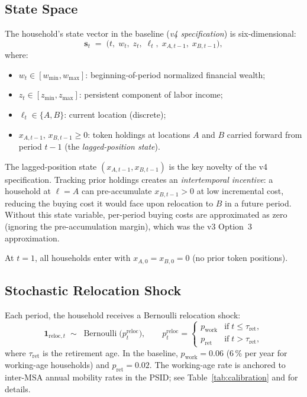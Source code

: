 \subsection{State Space}
\label{sec:model:state}

The household's state vector in the baseline (\emph{v4 specification}) is
six-dimensional:
\begin{equation}
    \mathbf{s}_t \;=\;
    \bigl(t,\;w_t,\;z_t,\;\ell_t,\;x_{A,t-1},\;x_{B,t-1}\bigr),
    \label{eq:state}
\end{equation}
where:
\begin{itemize}[noitemsep]
    \item $w_t \in [w_{\min}, w_{\max}]$: beginning-of-period normalized
          financial wealth;
    \item $z_t \in [z_{\min}, z_{\max}]$: persistent component of labor income;
    \item $\ell_t \in \{A, B\}$: current location (discrete);
    \item $x_{A,t-1},\, x_{B,t-1} \geq 0$: token holdings at locations $A$ and
          $B$ carried forward from period $t-1$ (the \emph{lagged-position state}).
\end{itemize}
The lagged-position state $(x_{A,t-1}, x_{B,t-1})$ is the key novelty of the
v4 specification.  Tracking prior holdings creates an \emph{intertemporal
incentive}: a household at $\ell = A$ can pre-accumulate $x_{B,t-1} > 0$
at low incremental cost, reducing the buying cost it would face upon
relocation to $B$ in a future period.
Without this state variable, per-period buying costs are approximated as
zero (ignoring the pre-accumulation margin), which was the v3 Option~3
approximation.

At $t = 1$, all households enter with $x_{A,0} = x_{B,0} = 0$ (no prior
token positions).

\subsection{Stochastic Relocation Shock}
\label{sec:model:relocation}

Each period, the household receives a Bernoulli relocation shock:
\begin{equation}
    \mathbf{1}_{\text{reloc},t} \;\sim\; \operatorname{Bernoulli}\!\bigl(p_t^{\text{reloc}}\bigr),
    \qquad
    p_t^{\text{reloc}} = \begin{cases}
        p_{\text{work}} & \text{if}\; t \leq \tau_{\text{ret}}, \\
        p_{\text{ret}}  & \text{if}\; t  >  \tau_{\text{ret}},
    \end{cases}
    \label{eq:reloc_prob}
\end{equation}
where $\tau_{\text{ret}}$ is the retirement age.  In the baseline,
$p_{\text{work}} = 0.06$ (6\,\% per year for working-age households) and
$p_{\text{ret}} = 0.02$.  The working-age rate is anchored to
inter-MSA annual mobility rates in the PSID; see
Table~\ref{tab:calibration} and \citet{calibrationV3} for details.

